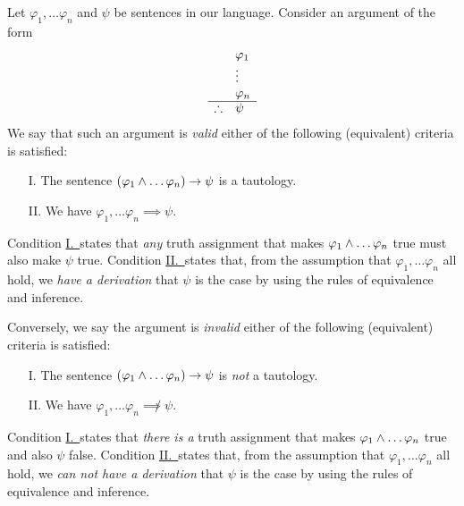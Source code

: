 \begin{definition}[Validity]
    Let \(\varphi_1, \dots \varphi_n\) and \(\psi\) be sentences in our language.
    Consider an argument of the form
    \[
    \begin{array}{ r l }
                & \varphi_1 \\
                & \vdots \\
                & \varphi_n \\
        \cline{1-2}
        \therefore & \psi
    \end{array}
    \]
    We say that such an argument is \emph{valid} \iffbydefn
    either of the following (equivalent) criteria is satisfied:
    \begin{enumerate}
        \item[I.]\label{validi}
            The sentence
            \(\pn*{\varphi_1 \meet \dots \varphi_n} \rightarrow \psi\)
            is a tautology.
        \item[II.]\label{validii}
            We have \(\varphi_1, \dots \varphi_n \implies \psi\).
    \end{enumerate}
    Condition \hyperref[validi]{I.\ }states that \emph{any} truth assignment
    that makes \(\varphi_1 \wedge \dots \varphi_n\) true must also make \(\psi\) true.
    Condition \hyperref[validi]{II.\ }states that,
    from the assumption that \(\varphi_1, \dots \varphi_n\) all hold,
    we \emph{have a derivation}
    that \(\psi\) is the case by using the rules of equivalence and inference.
\end{definition}

\begin{definition}[Invalidity]
    Conversely, we say the argument is \emph{invalid} \iffbydefn
    either of the following (equivalent) criteria is satisfied: 
    \begin{enumerate}
        \item[I.]
            The sentence
            \(\pn*{\varphi_1 \meet \dots \varphi_n} \rightarrow \psi\)
            is \emph{not} a tautology.
        \item[II.]
            We have \(\varphi_1, \dots \varphi_n \not \implies \psi\).
    \end{enumerate}
    Condition \hyperref[validi]{I.\ }states that \emph{there is a} truth assignment
    that makes \(\varphi_1 \wedge \dots \varphi_n\) true and also \(\psi\) false.
    Condition \hyperref[validi]{II.\ }states that,
    from the assumption that \(\varphi_1, \dots \varphi_n\) all hold,
    we \emph{can not have a derivation}
    that \(\psi\) is the case by using the rules of equivalence and inference.
\end{definition}

